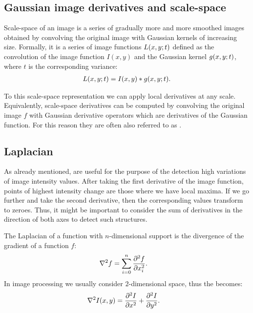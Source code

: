 \subsection{Gaussian image derivatives and scale-space}
\label{sec:gaussder}

Scale-space of an image is a series of gradually more and more smoothed images obtained by convolving the original image with Gaussian kernels of increasing size.
Formally, it is a series of image functions $L(x, y; t)$ defined as the convolution of the image function $I(x, y)$ and the Gaussian kernel $g(x, y; t)$, where $t$ is the corresponding variance: %
\begin{align*}
L(x, y; t) = I(x, y) * g(x, y; t).
\end{align*}

To this scale-space representation we can apply local derivatives at any scale.
Equivalently, scale-space derivatives can be computed by convolving the original image $f$ with Gaussian derivative operators which are derivatives of the Gaussian function.
For this reason they are often also referred to as .

\subsection{Laplacian}

As already mentioned,  are useful for the purpose of the detection high variations of image intensity values.
After taking the first derivative of the image function, points of highest intensity change are those where we have local maxima. 
If we go further and take the second derivative, then the corresponding values transform to zeroes.
Thus, it might be important to consider the sum of derivatives in the direction of both axes to detect such structures. 

\begin{definition}
The Laplacian of a function with $n$-dimensional support is the divergence of the gradient of a function $f$:
\begin{align*}
\nabla^{2}f &= \sum_{i=0}^{n} \frac{ \partial^2 f }{  \partial x_i^2  }.
\end{align*}
In image processing we usually consider $2$-dimensional space, thus the  becomes: 
\begin{align*}
\nabla ^{2}I(x, y)&=\frac{ \partial^2 I }{ \partial x^2 } + \frac{ \partial^2 I }{ \partial y^2 }.
\end{align*}
\end{definition} 

